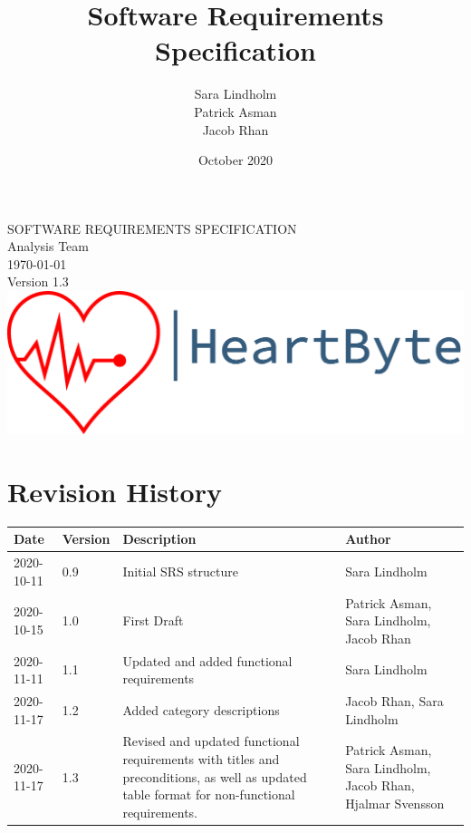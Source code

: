 \documentclass{scrreprt}
\title{Software Requirements Specification}
\author{Sara Lindholm \\ Patrick Asman \\ Jacob Rhan}
\date{October 2020}
\def\myversion{1.3}
\begin{document}
\begin{titlepage}
    \begin{center}
    \begin{bfseries}
        \Huge{SOFTWARE REQUIREMENTS SPECIFICATION}\\
        \vspace{1.5cm}
        \LARGE Analysis Team \\
        \vspace{1.5cm}
        \today\\
        \vspace{1.5cm}
        {Version \myversion}\\
        \vfill
        \includegraphics[width=\linewidth]{Pictures/logo.png} \\
    \end{bfseries}
    \end{center}
\end{titlepage}

\tableofcontents

\chapter*{Revision History}
\begin{center}
\begin{tabular}{|p{}|p{}|p{6cm}|p{4cm}|}
 \hline
 \textbf{Date} & \textbf{Version} & \textbf{Description} & \textbf{Author} \\ 
 \hline
 2020-10-11 & 0.9 & Initial SRS structure & Sara Lindholm \\
 \hline
 2020-10-15 & 1.0 & First Draft & Patrick Asman, Sara Lindholm, Jacob Rhan \\ 
 \hline
 2020-11-11 & 1.1 & Updated and added functional requirements & Sara Lindholm \\
 \hline
 2020-11-17 & 1.2 & Added category descriptions & Jacob Rhan, Sara Lindholm\\
 \hline
 2020-11-17 & 1.3 & Revised and updated functional requirements with titles and preconditions, as well as updated table format for non-functional requirements. & Patrick Asman, Sara Lindholm, Jacob Rhan, Hjalmar Svensson \\
 \hline
\end{tabular}
\end{center}
\end{document}
